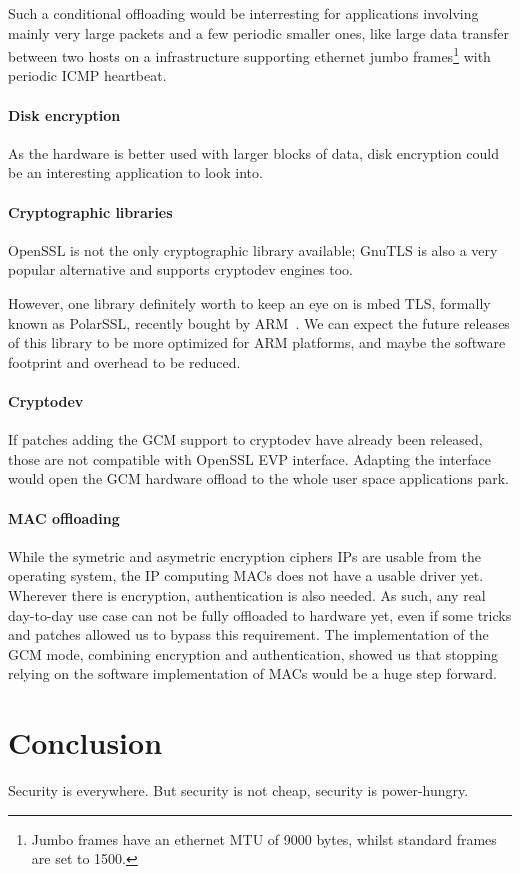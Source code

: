 Such a conditional offloading would be interresting for applications involving mainly very large packets and a few periodic smaller ones, like large data transfer between two hosts on a infrastructure supporting ethernet jumbo frames\footnote{Jumbo frames have an ethernet MTU of 9000 bytes, whilst standard frames are set to 1500.} with periodic ICMP heartbeat.

\paragraph{Disk encryption}
As the hardware is better used with larger blocks of data, disk encryption could be an interesting application to look into.

\paragraph{Cryptographic libraries}
OpenSSL is not the only cryptographic library available; GnuTLS is also a very popular alternative and supports cryptodev engines too.

However, one library definitely worth to keep an eye on is mbed TLS, formally known as PolarSSL, recently bought by ARM~\cite{2015-arm-buy-polarssl}.
We can expect the future releases of this library to be more optimized for ARM platforms, and maybe the software footprint and overhead to be reduced.


\paragraph{Cryptodev}
If patches adding the GCM support to cryptodev have already been released, those are not compatible with OpenSSL EVP interface.
Adapting the interface would open the GCM hardware offload to the whole user space applications park.

\paragraph{MAC offloading}
While the symetric and asymetric encryption ciphers IPs are usable from the operating system, the IP computing MACs does not have a usable driver yet.
Wherever there is encryption, authentication is also needed.
As such, any real day-to-day use case can not be fully offloaded to hardware yet, even if some tricks and patches allowed us to bypass this requirement.
The implementation of the GCM mode, combining encryption and authentication, showed us that stopping relying on the software implementation of MACs would be a huge step forward.



\section{Conclusion}



Security is everywhere.
But security is not cheap, security is power-hungry.